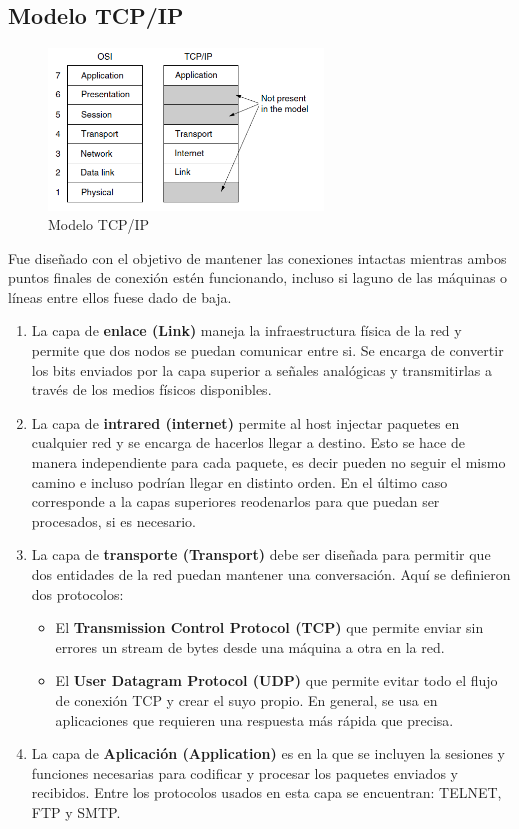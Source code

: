 \subsection{Modelo TCP/IP}
\begin{figure}[H]
	\centering
	\includegraphics[width=0.65\textwidth
]{images/tcpip.png}
	\caption[Modelo TCP/IP de Referencia]{Modelo TCP/IP}
	\label{fig:tcp}
\end{figure}

Fue diseñado con el objetivo de mantener las conexiones intactas mientras ambos puntos finales de conexión estén funcionando, incluso si laguno de las máquinas o líneas entre ellos fuese dado de baja.

\begin{enumerate}
  \item La capa de \textbf{enlace (Link)} maneja la infraestructura física de la red y permite que dos nodos se puedan comunicar entre si. Se encarga de convertir los bits enviados por la capa superior a señales analógicas y transmitirlas a través de los medios físicos disponibles.
  \item La capa de \textbf{intrared (internet)} permite al host injectar paquetes en cualquier red y se encarga de hacerlos llegar a destino. Esto se hace de manera independiente para cada paquete, es decir pueden no seguir el mismo camino e incluso podrían llegar en distinto orden. En el último caso corresponde a la capas superiores reodenarlos para que puedan ser procesados, si es necesario.
  \item La capa de \textbf{transporte (Transport)} debe ser diseñada para permitir que dos entidades de la red puedan mantener una conversación. Aquí se definieron dos protocolos:
  \begin{itemize}
    \item El \textbf{Transmission Control Protocol (TCP)} que permite enviar sin errores un stream de bytes desde una máquina a otra en la red.
    \item El \textbf{User Datagram Protocol (UDP)} que permite evitar todo el flujo de conexión TCP y crear el suyo propio. En general, se usa en aplicaciones que requieren una respuesta más rápida que precisa. 
  \end{itemize}
  \item La capa de \textbf{Aplicación (Application)} es en la que se incluyen la sesiones y funciones necesarias para codificar y procesar los paquetes enviados y recibidos. Entre los protocolos usados en esta capa se encuentran: TELNET, FTP y SMTP.
\end{enumerate}
